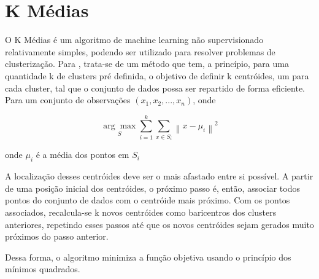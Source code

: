\section{K Médias}

O K Médias é um algoritmo de machine learning não supervisionado relativamente simples, podendo ser utilizado para resolver problemas de clusterização. Para , trata-se de um método que tem, a princípio, para uma quantidade k de clusters pré definida, o objetivo de definir k centróides, um para cada cluster, tal que o conjunto de dados possa ser repartido de forma eficiente. Para um conjunto de observações \begin{math}(x_{1}, x_{2}, ..., x_{n})\end{math}, onde 

\begin{equation}
\label{eq:media}
\underset{S}{\arg\max} \sum_{i=1}^{k} \sum_{x \in S_{i}}\left \| x - \mu_{i} \right \|^{2}
\end{equation}

onde \begin{math}\mu_{i}\end{math} é a média dos pontos em \begin{math}S_{i}\end{math}


A localização desses centróides deve ser o mais afastado entre si possível. A partir de uma posição inicial dos centróides, o próximo passo é, então, associar todos pontos do conjunto de dados com o centróide mais próximo. Com os pontos associados, recalcula-se k novos centróides como baricentros dos clusters anteriores, repetindo esses passos até que os novos centróides sejam gerados muito próximos do passo anterior. 


Dessa forma, o algoritmo minimiza a função objetiva usando o princípio dos mínimos quadrados. 
